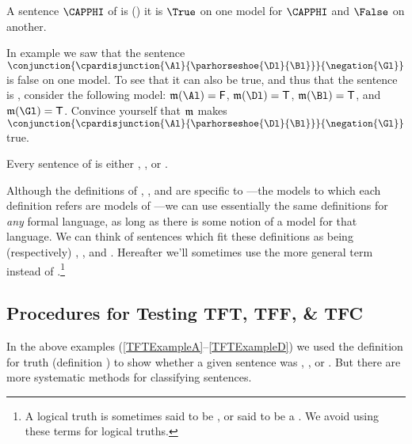 \begin{majorILnc}{}
A sentence $\CAPPHI$ of \GSL{} is  () \Iff it is $\True$ on one model for $\CAPPHI$ and $\False$ on another. 
\end{majorILnc}

\begin{majorILnc}{}
In example  we saw that the sentence $\conjunction{\cpardisjunction{\Al}{\parhorseshoe{\Dl}{\Bl}}}{\negation{\Gl}}$ is false on one model.
To see that it can also be true, and thus that the sentence is , consider the following model: $\IntA(\Al)=\FalseB$, $\IntA(\Dl)=\TrueB$, $\IntA(\Bl)=\TrueB$, and $\IntA(\Gl)=\TrueB$.
Convince yourself that $\mathfrak{m}$ makes $\conjunction{\cpardisjunction{\Al}{\parhorseshoe{\Dl}{\Bl}}}{\negation{\Gl}}$ true. 
\end{majorILnc}

\noindent{}Every sentence of \GSL{} is either , , or .

Although the definitions of , , and  are specific to \GSL{}---the models to which each definition refers are models of \GSL{}---we can use essentially the same definitions for \emph{any} formal language, as long as there is some notion of a model for that language. 
We can think of sentences which fit these definitions as being (respectively) , , and . Hereafter we'll sometimes use the more general term  instead of .\footnote{
	A logical truth is sometimes said to be , or said to be a . 
	We avoid using these terms for logical truths.
}

\subsection{Procedures for Testing TFT, TFF, \& TFC}\label{Proceduresfortesting}

In the above examples (\ref{TFTExampleA}--\ref{TFTExampleD}) we used the definition for truth (definition ) to show whether a given \GSL{} sentence was , , or . 
But there are more systematic methods for classifying \GSL{} sentences. 

